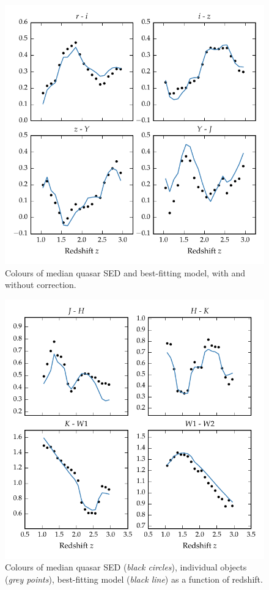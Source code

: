 \begin{figure}
\includegraphics[width=\textwidth]{figures/chapter05/sed_color_plot_1.pdf}
\caption[{Colours of median quasar SED and best-fitting model, with and without correction.}]{Colours of median quasar SED and best-fitting model, with and without correction.}
  \label{fig:color_1}
\end{figure} 


\begin{figure}
\includegraphics[width=\textwidth]{figures/chapter05/sed_color_plot_2.pdf}
\caption[{Colours of median quasar SED, individual objects, best-fitting  model as a function of redshift.}]{Colours of median quasar SED ({\it black circles}), individual objects ({\it grey points}), best-fitting  model ({\it black line}) as a function of redshift.}
  \label{fig:color_2}
\end{figure} 

